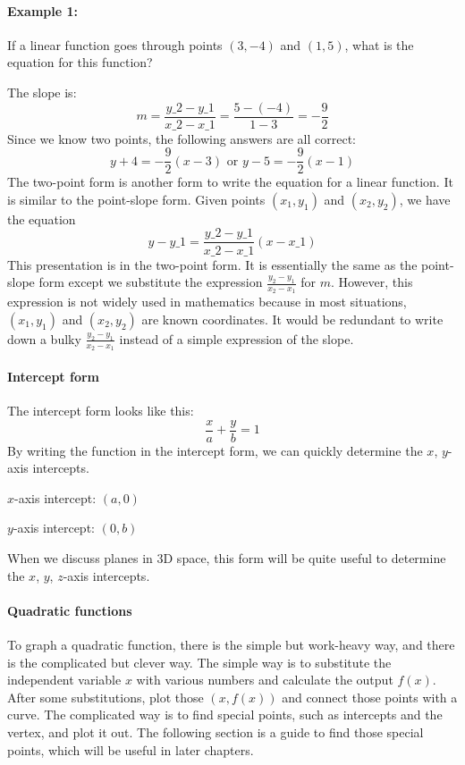 \paragraph{Example 1:}

If a linear function goes through points $(3, -4)$ and $(1, 5)$, what is the equation for this function?

The slope is:
$$
m = \frac{y\_2 - y\_1}{x\_2 - x\_1} = \frac{5 - (-4)}{1 - 3} = -\frac{9}{2}
$$
Since we know two points, the following answers are all correct:
$$
y + 4 = -\frac{9}{2}(x - 3) \text{ or } y - 5 = -\frac{9}{2}(x - 1)
$$
The two-point form is another form to write the equation for a linear function. It is similar to the point-slope form. Given points $(x_1, y_1)$ and $(x_2, y_2)$, we have the equation
$$
y - y\_1 = \frac{y\_2 - y\_1}{x\_2 - x\_1}(x - x\_1)
$$
This presentation is in the two-point form. It is essentially the same as the point-slope form except we substitute the expression $\frac{y_2 - y_1}{x_2 - x_1}$ for $m$. However, this expression is not widely used in mathematics because in most situations, $(x_1, y_1)$ and $(x_2, y_2)$ are known coordinates. It would be redundant to write down a bulky $\frac{y_2 - y_1}{x_2 - x_1}$ instead of a simple expression of the slope.

\paragraph{Intercept form}

The intercept form looks like this:
$$
\frac{x}{a} + \frac{y}{b} = 1
$$
By writing the function in the intercept form, we can quickly determine the $x$, $y$-axis intercepts.

$x$-axis intercept: $(a, 0)$

$y$-axis intercept: $(0, b)$

When we discuss planes in 3D space, this form will be quite useful to determine the $x$, $y$, $z$-axis intercepts.

\paragraph{Quadratic functions}

To graph a quadratic function, there is the simple but work-heavy way, and there is the complicated but clever way. The simple way is to substitute the independent variable $x$ with various numbers and calculate the output $f(x)$. After some substitutions, plot those $(x, f(x))$ and connect those points with a curve. The complicated way is to find special points, such as intercepts and the vertex, and plot it out. The following section is a guide to find those special points, which will be useful in later chapters.

